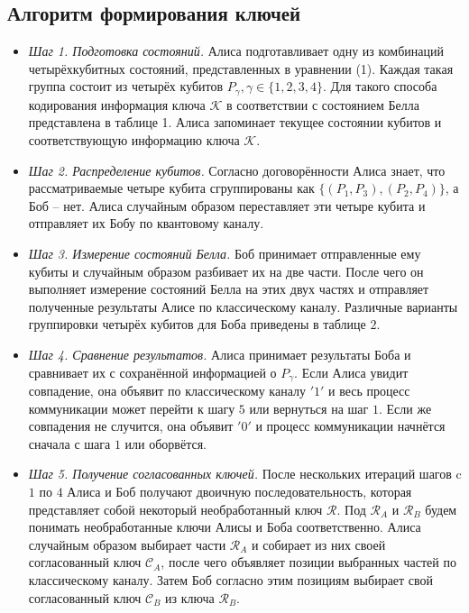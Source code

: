 \documentclass[a4paper,11pt]{article}
\begin{document}
\subsection{Алгоритм формирования ключей}

\begin{itemize}

\item \textit{Шаг 1. Подготовка состояний.} Алиса подготавливает одну из комбинаций четырёхкубитных состояний, представленных в уравнении (1). Каждая такая группа состоит из четырёх кубитов $P_\gamma, \gamma \in \{1,2,3,4\}$. Для такого способа кодирования информация ключа $\mathcal{K}$ в соответствии с состоянием Белла представлена в таблице 1. Алиса запоминает текущее состоянии кубитов и соответствующую информацию ключа $\mathcal{K}$.

\item \textit{Шаг 2. Распределение кубитов.} Согласно договорённости Алиса знает, что рассматриваемые четыре кубита сгруппированы как $\{(P_1, P_3), (P_2, P_4)\}$, а Боб -- нет. Алиса случайным образом переставляет эти четыре кубита и отправляет их Бобу по квантовому каналу.

\item \textit{Шаг 3. Измерение состояний Белла.} Боб принимает отправленные ему кубиты и случайным образом разбивает их на две части. После чего он выполняет измерение состояний Белла на этих двух частях и отправляет полученные результаты Алисе по классическому каналу. Различные варианты группировки четырёх кубитов для Боба приведены в таблице $2$.

\item \textit{Шаг 4. Сравнение результатов.} Алиса принимает результаты Боба и сравнивает их с сохранённой информацией о $P_\gamma$. Если Алиса увидит совпадение, она объявит по классическому каналу $'1'$ и весь процесс коммуникации может перейти к шагу $5$ или вернуться на шаг $1$. Если же совпадения не случится, она объявит $'0'$ и процесс коммуникации начнётся сначала с шага $1$ или оборвётся. 

\item \textit{Шаг 5. Получение согласованных ключей.} После нескольких итераций шагов c $1$ по $4$ Алиса и Боб получают двоичную последовательность, которая представляет собой некоторый необработанный ключ $\mathcal{R}$. Под $\mathcal{R}_A$ и $\mathcal{R}_B$ будем понимать необработанные ключи Алисы и Боба соответственно. Алиса случайным образом выбирает части $\mathcal{R}_A$ и собирает из них своей согласованный ключ $\mathcal{C}_A$, после чего объявляет позиции выбранных частей по классическому каналу. Затем Боб согласно этим позициям выбирает свой согласованный ключ $\mathcal{C}_B$ из ключа $\mathcal{R}_B$.


\end{itemize}
\end{document}
